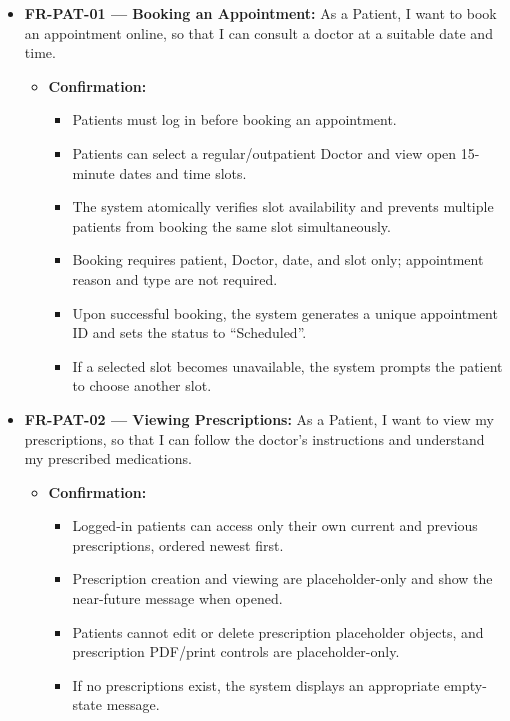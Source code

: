 \documentclass[11pt,a4paper]{article}
\begin{document}
\begin{itemize}
    \item \textbf{FR-PAT-01 — Booking an Appointment:} As a Patient, I want to book an appointment online, so that I can consult a doctor at a suitable date and time.
    \begin{itemize}
        \item \textbf{Confirmation:}
        \begin{itemize}
            \item Patients must log in before booking an appointment.
            \item Patients can select a regular/outpatient Doctor and view open 15-minute dates and time slots.
            \item The system atomically verifies slot availability and prevents multiple patients from booking the same slot simultaneously.
            \item Booking requires patient, Doctor, date, and slot only; appointment reason and type are not required.
            \item Upon successful booking, the system generates a unique appointment ID and sets the status to ``Scheduled''.
            \item If a selected slot becomes unavailable, the system prompts the patient to choose another slot.
        \end{itemize}
    \end{itemize}

    \item \textbf{FR-PAT-02 — Viewing Prescriptions:} As a Patient, I want to view my prescriptions, so that I can follow the doctor's instructions and understand my prescribed medications.
    \begin{itemize}
        \item \textbf{Confirmation:}
        \begin{itemize}
            \item Logged-in patients can access only their own current and previous prescriptions, ordered newest first.
            \item Prescription creation and viewing are placeholder-only and show the near-future message when opened.
            \item Patients cannot edit or delete prescription placeholder objects, and prescription PDF/print controls are placeholder-only.
            \item If no prescriptions exist, the system displays an appropriate empty-state message.
        \end{itemize}
    \end{itemize}


\end{itemize}
\end{document}
